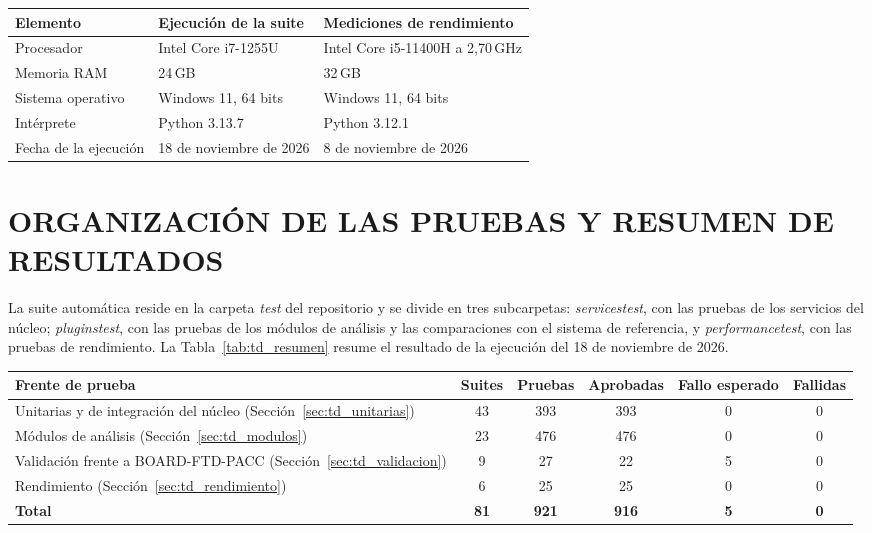 \documentclass[12pt,letterpaper,oneside]{article}
\DeclareRobustCommand{\_}{\textunderscore\allowbreak}
\newcommand{\capitulo}[1]{\clearpage\section{#1}}
\begin{document}
\begin{center}
\small
\begin{tabularx}{\textwidth}{|p{}|X|X|}
\hline
\textbf{Elemento} & \textbf{Ejecución de la suite} & \textbf{Mediciones de rendimiento} \\
\hline
Procesador & Intel Core i7-1255U & Intel Core i5-11400H a 2,70\,GHz \\
\hline
Memoria RAM & 24\,GB & 32\,GB \\
\hline
Sistema operativo & Windows 11, 64 bits & Windows 11, 64 bits \\
\hline
Intérprete & Python 3.13.7 & Python 3.12.1 \\
\hline
Fecha de la ejecución & 18 de noviembre de 2026 & 8 de noviembre de 2026 \\
\hline
\end{tabularx}
\label{tab:td_entorno}
\end{center}
\capitulo{ORGANIZACIÓN DE LAS PRUEBAS Y RESUMEN DE RESULTADOS}
\label{sec:td_resumen}

La suite automática reside en la carpeta \textit{test} del repositorio y se divide en tres subcarpetas: \textit{services\_test}, con las pruebas de los servicios del núcleo; \textit{plugins\_test}, con las pruebas de los módulos de análisis y las comparaciones con el sistema de referencia, y \textit{performance\_test}, con las pruebas de rendimiento. La Tabla~\ref{tab:td_resumen} resume el resultado de la ejecución del 18 de noviembre de 2026.

\begin{center}
\small
\begin{tabularx}{\textwidth}{|X|c|c|c|c|c|}
\hline
\textbf{Frente de prueba} & \textbf{Suites} & \textbf{Pruebas} & \textbf{Aprobadas} & \textbf{Fallo esperado} & \textbf{Fallidas} \\
\hline
Unitarias y de integración del núcleo (Sección~\ref{sec:td_unitarias}) & 43 & 393 & 393 & 0 & 0 \\
\hline
Módulos de análisis (Sección~\ref{sec:td_modulos}) & 23 & 476 & 476 & 0 & 0 \\
\hline
Validación frente a BOARD-FTD-PACC (Sección~\ref{sec:td_validacion}) & 9 & 27 & 22 & 5 & 0 \\
\hline
Rendimiento (Sección~\ref{sec:td_rendimiento}) & 6 & 25 & 25 & 0 & 0 \\
\hline
\textbf{Total} & \textbf{81} & \textbf{921} & \textbf{916} & \textbf{5} & \textbf{0} \\
\hline
\end{tabularx}
\label{tab:td_resumen}
\end{center}
\end{document}
